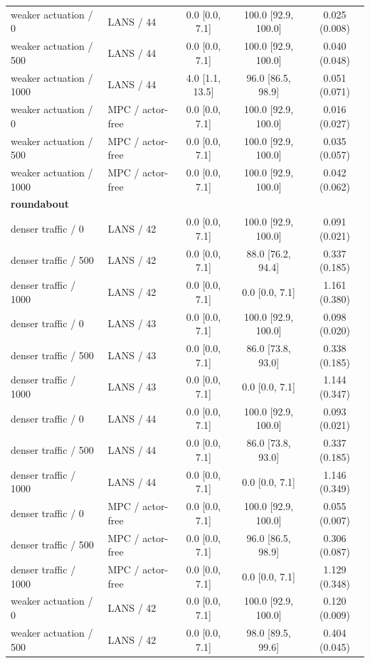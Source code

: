 \begin{longtable}{llccc}
weaker actuation / 0 & LANS / 44 & 0.0 [0.0, 7.1] & 100.0 [92.9, 100.0] & 0.025 (0.008) \\
weaker actuation / 500 & LANS / 44 & 0.0 [0.0, 7.1] & 100.0 [92.9, 100.0] & 0.040 (0.048) \\
weaker actuation / 1000 & LANS / 44 & 4.0 [1.1, 13.5] & 96.0 [86.5, 98.9] & 0.051 (0.071) \\
weaker actuation / 0 & MPC / actor-free & 0.0 [0.0, 7.1] & 100.0 [92.9, 100.0] & 0.016 (0.027) \\
weaker actuation / 500 & MPC / actor-free & 0.0 [0.0, 7.1] & 100.0 [92.9, 100.0] & 0.035 (0.057) \\
weaker actuation / 1000 & MPC / actor-free & 0.0 [0.0, 7.1] & 100.0 [92.9, 100.0] & 0.042 (0.062) \\
\multicolumn{5}{l}{\textbf{roundabout}} \\
denser traffic / 0 & LANS / 42 & 0.0 [0.0, 7.1] & 100.0 [92.9, 100.0] & 0.091 (0.021) \\
denser traffic / 500 & LANS / 42 & 0.0 [0.0, 7.1] & 88.0 [76.2, 94.4] & 0.337 (0.185) \\
denser traffic / 1000 & LANS / 42 & 0.0 [0.0, 7.1] & 0.0 [0.0, 7.1] & 1.161 (0.380) \\
denser traffic / 0 & LANS / 43 & 0.0 [0.0, 7.1] & 100.0 [92.9, 100.0] & 0.098 (0.020) \\
denser traffic / 500 & LANS / 43 & 0.0 [0.0, 7.1] & 86.0 [73.8, 93.0] & 0.338 (0.185) \\
denser traffic / 1000 & LANS / 43 & 0.0 [0.0, 7.1] & 0.0 [0.0, 7.1] & 1.144 (0.347) \\
denser traffic / 0 & LANS / 44 & 0.0 [0.0, 7.1] & 100.0 [92.9, 100.0] & 0.093 (0.021) \\
denser traffic / 500 & LANS / 44 & 0.0 [0.0, 7.1] & 86.0 [73.8, 93.0] & 0.337 (0.185) \\
denser traffic / 1000 & LANS / 44 & 0.0 [0.0, 7.1] & 0.0 [0.0, 7.1] & 1.146 (0.349) \\
denser traffic / 0 & MPC / actor-free & 0.0 [0.0, 7.1] & 100.0 [92.9, 100.0] & 0.055 (0.007) \\
denser traffic / 500 & MPC / actor-free & 0.0 [0.0, 7.1] & 96.0 [86.5, 98.9] & 0.306 (0.087) \\
denser traffic / 1000 & MPC / actor-free & 0.0 [0.0, 7.1] & 0.0 [0.0, 7.1] & 1.129 (0.348) \\
weaker actuation / 0 & LANS / 42 & 0.0 [0.0, 7.1] & 100.0 [92.9, 100.0] & 0.120 (0.009) \\
weaker actuation / 500 & LANS / 42 & 0.0 [0.0, 7.1] & 98.0 [89.5, 99.6] & 0.404 (0.045) \\

\end{longtable}
